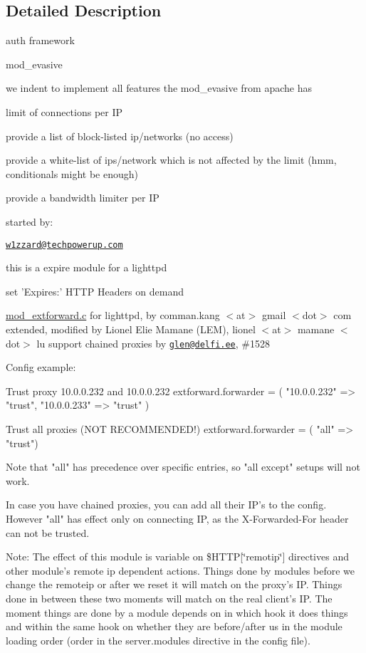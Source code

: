 \subsection{Detailed Description}
auth framework

mod\-\_\-evasive

we indent to implement all features the mod\-\_\-evasive from apache has


\begin{DoxyItemize}
\item limit of connections per I\-P
\item provide a list of block-\/listed ip/networks (no access)
\item provide a white-\/list of ips/network which is not affected by the limit (hmm, conditionals might be enough)
\item provide a bandwidth limiter per I\-P
\end{DoxyItemize}

started by\-:
\begin{DoxyItemize}
\item \href{mailto:w1zzard@techpowerup.com}{\tt w1zzard@techpowerup.\-com}
\end{DoxyItemize}

this is a expire module for a lighttpd

set 'Expires\-:' H\-T\-T\-P Headers on demand

\hyperlink{mod__extforward_8c}{mod\-\_\-extforward.\-c} for lighttpd, by comman.\-kang $<$at$>$ gmail $<$dot$>$ com extended, modified by Lionel Elie Mamane (L\-E\-M), lionel $<$at$>$ mamane $<$dot$>$ lu support chained proxies by \href{mailto:glen@delfi.ee}{\tt glen@delfi.\-ee}, \#1528

Config example\-: \begin{DoxyVerb}  Trust proxy 10.0.0.232 and 10.0.0.232
  extforward.forwarder = ( "10.0.0.232" => "trust",
                           "10.0.0.233" => "trust" )

  Trust all proxies  (NOT RECOMMENDED!)
  extforward.forwarder = ( "all" => "trust")

  Note that "all" has precedence over specific entries,
  so "all except" setups will not work.

  In case you have chained proxies, you can add all their IP's to the
  config. However "all" has effect only on connecting IP, as the
  X-Forwarded-For header can not be trusted.
\end{DoxyVerb}


Note\-: The effect of this module is variable on \$\-H\-T\-T\-P\mbox{[}\char`\"{}remotip\char`\"{}\mbox{]} directives and other module's remote ip dependent actions. Things done by modules before we change the remoteip or after we reset it will match on the proxy's I\-P. Things done in between these two moments will match on the real client's I\-P. The moment things are done by a module depends on in which hook it does things and within the same hook on whether they are before/after us in the module loading order (order in the server.\-modules directive in the config file).

